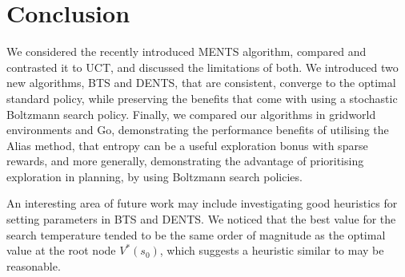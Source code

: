 \documentclass{article}
\theoremstyle{plain}
\begin{document}
    



    
    
    

\section{Conclusion}
    We considered the recently introduced MENTS algorithm, compared and contrasted it to UCT, and discussed the limitations of both. We introduced two new algorithms, BTS and DENTS, that are consistent, converge to the optimal standard policy, while preserving the benefits that come with using a stochastic Boltzmann search policy. Finally, we compared our algorithms in gridworld environments and Go, demonstrating the performance benefits of utilising the Alias method, that entropy can be a useful exploration bonus with sparse rewards, and more generally, 
    demonstrating the advantage of prioritising exploration in planning, by using Boltzmann search policies. 
    
    An interesting area of future work may include investigating good heuristics for setting parameters in BTS and DENTS. We noticed that the best value for the search temperature tended to be the same order of magnitude as the optimal value at the root node $V^*(s_0)$, which suggests a heuristic similar to \cite{prst} may be reasonable.






{
    \small
    
    
    
}
    

    
    
    













\newpage





    
    
\end{document}
